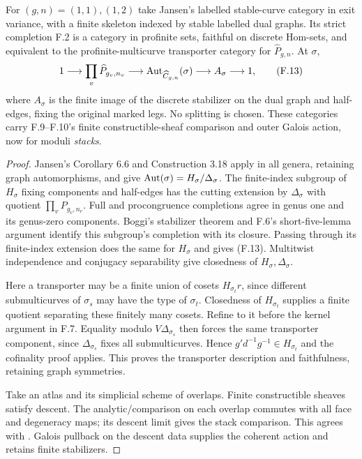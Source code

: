 For $(g,n)=(1,1),(1,2)$ take Jansen's labelled stable-curve category in exit variance, with a finite skeleton indexed by stable labelled dual graphs. Its strict completion F.2 is a category in profinite sets, faithful on discrete Hom-sets, and equivalent to the profinite-multicurve transporter category for $\widehat P_{g,n}$. At $\sigma$,
\[
 1\longrightarrow\prod_v\widehat P_{g_v,n_v}
 \longrightarrow\operatorname{Aut}_{\widehat C_{g,n}}(\sigma)
 \longrightarrow A_\sigma\longrightarrow1,                  \tag{F.13}
\]
where $A_\sigma$ is the finite image of the discrete stabilizer on the dual graph and half-edges, fixing the original marked legs. No splitting is chosen. These categories carry F.9--F.10's finite constructible-sheaf comparison and outer Galois action, now for moduli \emph{stacks}.
\begin{proof}
Jansen's Corollary 6.6 and Construction 3.18 apply in all genera, retaining graph automorphisms, and give $\operatorname{Aut}(\sigma)=H_\sigma/\Delta_\sigma$. The finite-index subgroup of $H_\sigma$ fixing components and half-edges has the cutting extension by $\Delta_\sigma$ with quotient $\prod_vP_{g_v,n_v}$. Full and procongruence completions agree in genus one and its genus-zero components. Boggi's stabilizer theorem and F.6's short-five-lemma argument identify this subgroup's completion with its closure. Passing through its finite-index extension does the same for $H_\sigma$ and gives (F.13). Multitwist independence and conjugacy separability give closedness of $H_\sigma,\Delta_\sigma$.

Here a transporter may be a finite union of cosets $H_{\sigma_t}r$, since different submulticurves of $\sigma_s$ may have the type of $\sigma_t$. Closedness of $H_{\sigma_t}$ supplies a finite quotient separating these finitely many cosets. Refine to it before the kernel argument in F.7. Equality modulo $V\Delta_{\sigma_s}$ then forces the same transporter component, since $\Delta_{\sigma_s}$ fixes all submulticurves. Hence $g'd^{-1}g^{-1}\in H_{\sigma_t}$ and the cofinality proof applies. This proves the transporter description and faithfulness, retaining graph symmetries.

Take an \etale atlas and its simplicial scheme of overlaps. Finite constructible sheaves satisfy descent. The analytic/\etale comparison on each overlap commutes with all face and degeneracy maps; its descent limit gives the stack comparison. This agrees with \citet[Proposition 13.9.17 and Corollary 13.9.19]{AF_BGH2020}. Galois pullback on the descent data supplies the coherent action and retains finite stabilizers.
\end{proof}

